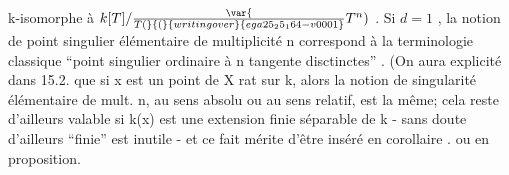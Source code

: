 
k-isomorphe à $k[T]/\var{\over{T}{(}}{(}{writing over}{ega25_25_164-v0001}T^n)$ . Si $d=1$ , la notion de point singulier
 élémentaire de multiplicité n correspond à la terminologie
classique ``point singulier ordinaire à n tangente disctinctes'' .
(On aura  explicité dans 15.2. que si x est un point de X rat sur k, alors
la notion de singularité élémentaire de mult. n, au sens absolu ou au
sens relatif,  est la même; cela reste d'ailleurs valable si k(x)
est une extension finie séparable de k - sans doute d'ailleurs ``finie''
est inutile - et ce fait mérite d'être inséré en corollaire .
ou en proposition\hand{)}.

